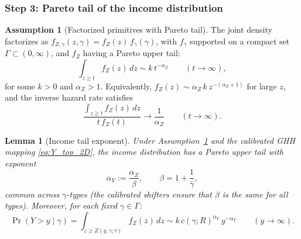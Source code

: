 \documentclass[12pt,a4paper]{article}
\theoremstyle{definition}
\newtheorem{assumption}{Assumption}[section]
\theoremstyle{plain}
\newtheorem{lemma}{Lemma}[section]
\theoremstyle{remark}
\begin{document}
\subsubsection{Step 3: Pareto tail of the income distribution}

\begin{assumption}[Factorized primitives with Pareto tail]
\label{as:2D_pareto}
The joint density factorizes as $f_{Z,\gamma}(z,\gamma) = f_Z(z)\,f_{\gamma}(\gamma)$, with $f_{\gamma}$ supported on a compact set $\Gamma \subset (0,\infty)$, and $f_Z$ having a Pareto upper tail:
\begin{equation}
\label{eq:Pareto_tail_2D}
  \int_{z \geq t} f_Z(z)\,dz \sim k\,t^{-\alpha_Z} \qquad (t \to \infty),
\end{equation}
for some $k > 0$ and $\alpha_Z > 1$.  Equivalently, $f_Z(z) \sim \alpha_Z\,k\,z^{-(\alpha_Z+1)}$ for large $z$, and the inverse hazard rate satisfies
\begin{equation}
\label{eq:Pareto_hazard_2D}
  \frac{\int_{z \geq t} f_Z(z)\,dz}{t\,f_Z(t)} \to \frac{1}{\alpha_Z} \qquad (t \to \infty).
\end{equation}
\end{assumption}

\begin{lemma}[Income tail exponent]
\label{lem:income_pareto_2D}
Under Assumption~\ref{as:2D_pareto} and the calibrated GHH mapping \eqref{eq:Y_top_2D}, the income distribution has a Pareto upper tail with exponent
\begin{equation}
\label{eq:alpha_Y_2D}
  \alpha_Y := \frac{\alpha_Z}{\beta}, \qquad \beta = 1+\frac{1}{\bar\gamma},
\end{equation}
common across $\gamma$-types (the calibrated shifters ensure that $\beta$ is the same for all types).  Moreover, for each fixed $\gamma \in \Gamma$:
\begin{equation}
\label{eq:income_tail_gamma}
  \Pr(Y > y \mid \gamma) = \int_{z \geq Z(y,\gamma;\tau)} f_Z(z)\,dz \sim k\,c(\gamma;R)^{\alpha_Y}\,y^{-\alpha_Y} \qquad (y \to \infty).
\end{equation}
\end{lemma}
\end{document}
